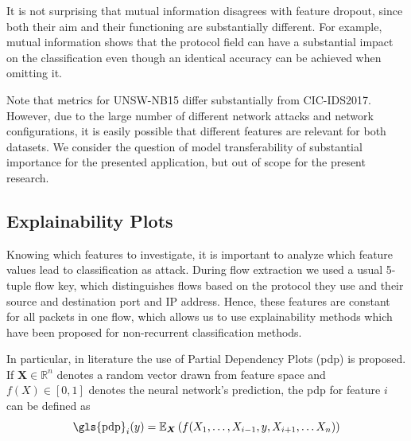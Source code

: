 \documentclass[conference]{IEEEtran}
\begin{document}
It is not surprising that mutual information disagrees with feature dropout, since both their aim and their functioning are substantially different. For example, mutual information shows that the protocol field can have a substantial impact on the classification even though an identical accuracy can be achieved when omitting it.


Note that metrics for UNSW-NB15 differ substantially from CIC-IDS2017. However, due to the large number of different network attacks and network configurations, it is easily possible that different features are relevant for both datasets. We consider the question of model transferability of substantial importance for the presented application, but out of scope for the present research.

\subsection{Explainability Plots}
Knowing which features to investigate, it is important to analyze which feature values lead to classification as attack.
During flow extraction we used a usual 5-tuple flow key, which distinguishes flows based on the protocol they use and their source and destination port and IP address. Hence, these features are constant for all packets in one flow, which allows us to use explainability methods which have been proposed for non-recurrent classification methods.

In particular,  in literature the use of Partial Dependency Plots (\gls{pdp}) is proposed. If $\boldsymbol X \in \mathbb R ^n$ denotes a random vector drawn from feature space and $f(X) \in [0,1]$ denotes the neural network's prediction, the \gls{pdp} for feature $i$ can be defined as
\begin{equation} \label{eq:pdp}
\text{\gls{pdp}}_i(y) = \mathbb E_{\boldsymbol X}\left(f(X_1,\ldots,X_{i-1},y,X_{i+1},\ldots X_n)\right)
\end{equation}
\end{document}
